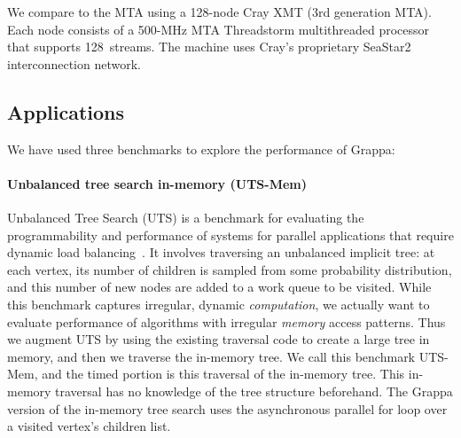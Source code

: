 We compare to the MTA using a 128-node Cray XMT (3rd generation MTA).
Each node consists of a 500-MHz MTA Threadstorm multithreaded processor
that supports 128~streams. The machine uses Cray's proprietary SeaStar2
interconnection network.

\subsection{Applications}

We have used three benchmarks to explore the performance of Grappa:

\paragraph{Unbalanced tree search in-memory (UTS-Mem)} Unbalanced Tree
Search (UTS) is a benchmark for evaluating the programmability and
performance of systems for parallel applications that require dynamic
load balancing~\cite{UTS}. It involves traversing an
unbalanced implicit tree: at each vertex, its number of children is
sampled from some probability distribution, and this number of new nodes
are added to a work queue to be visited. While this benchmark captures
irregular, dynamic \emph{computation}, we actually want to evaluate
performance of algorithms with irregular \emph{memory} access patterns.
Thus we augment UTS by using the existing traversal code to create a
large tree in memory, and then we traverse the in-memory tree. We call
this benchmark UTS-Mem, and the timed portion is this traversal of the
in-memory tree. This in-memory traversal has no knowledge of the
tree structure beforehand.  The Grappa version of the in-memory tree
search uses the asynchronous parallel for loop over a visited vertex's
children list.


